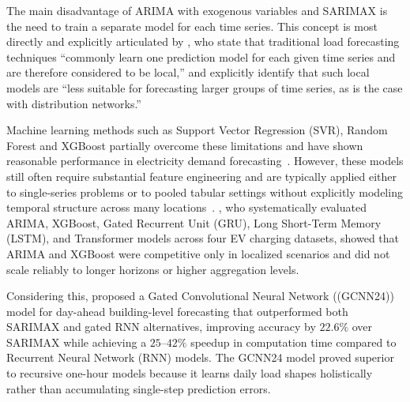The main disadvantage of ARIMA with exogenous variables and SARIMAX is the need to train a separate model for
each time series. This concept is most directly and explicitly articulated by
\citet{grabner2023}, who state that traditional load forecasting techniques
``commonly learn one prediction model for each given time series and are therefore
considered to be local,'' and explicitly identify that such local models are ``less
suitable for forecasting larger groups of time series, as is the case with distribution
networks.''

Machine learning methods such as Support Vector Regression (SVR), Random Forest and XGBoost
partially overcome these limitations and have shown reasonable performance in electricity
demand forecasting~\cite{sinitsyn2023}. However, these models still often require
substantial feature engineering and are typically applied either to single-series problems
or to pooled tabular settings without explicitly modeling temporal structure across many
locations~\cite{liu2025}. \citet{kyriakopoulos2025}, who systematically evaluated ARIMA,
XGBoost, Gated Recurrent Unit (GRU), Long Short-Term Memory (LSTM), and Transformer models across four EV charging datasets, showed that
ARIMA and XGBoost were competitive only in localized scenarios and did not scale reliably
to longer horizons or higher aggregation levels.

Considering this, \citet{cai2019} proposed a Gated Convolutional Neural Network ((GCNN24)) model for day-ahead building-level
forecasting that outperformed both SARIMAX and gated RNN alternatives, improving accuracy
by $22.6\%$ over SARIMAX while achieving a $25$--$42\%$ speedup in computation time
compared to Recurrent Neural Network (RNN) models. The GCNN24 model proved superior to
recursive one-hour models because it learns daily load shapes holistically rather than
accumulating single-step prediction errors.

